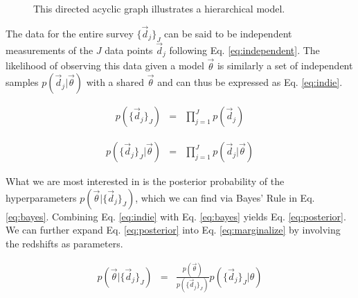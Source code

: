 \documentclass[12pt, onecolumn]{emulateapj}
\begin{document}
\begin{figure}
\label{fig:flow}
\vspace{0.5cm}
\begin{center}
\caption{This directed acyclic graph illustrates a hierarchical model.}
\end{center}
\end{figure}

The data for the entire survey $\{\vec{d}_{j}\}_{J}$ can be said to be independent measurements of the $J$ data points $\vec{d}_{j}$ following Eq. \ref{eq:independent}.  The likelihood of observing this data given a model $\vec{\theta}$ is similarly a set of independent samples $p(\vec{d}_{j}|\vec{\theta})$ with a shared $\vec{\theta}$ and can thus be expressed as Eq. \ref{eq:indie}.

\begin{eqnarray}
\label{eq:independent}
p(\{\vec{d}_{j}\}_{J}) &=& \prod_{j=1}^{J}p(\vec{d}_{j})
\end{eqnarray}

\begin{eqnarray}
\label{eq:indie}
p(\{\vec{d}_{j}\}_{J}|\vec{\theta}) &=& \prod_{j=1}^{J}p(\vec{d}_{j}|\vec{\theta})
\end{eqnarray}

What we are most interested in is the posterior probability of the hyperparameters $p(\vec{\theta}|\{\vec{d}_{j}\}_{J})$, which we can find via Bayes' Rule in Eq. \ref{eq:bayes}.  Combining Eq. \ref{eq:indie} with Eq. \ref{eq:bayes} yields Eq. \ref{eq:posterior}.  We can further expand Eq. \ref{eq:posterior} into Eq. \ref{eq:marginalize} by involving the redshifts as parameters.

\begin{eqnarray}
\label{eq:bayes}
p(\vec{\theta}|\{\vec{d}_{j}\}_{J}) &=& \frac{p(\vec{\theta})}{p(\{\vec{d}_{j}\}_{J})}p(\{\vec{d}_{j}\}_{J}|\theta)
\end{eqnarray}
\end{document}
